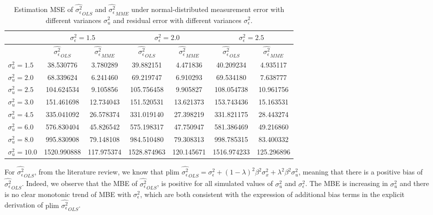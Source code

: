 \documentclass{article}
\begin{document}
\begin{table}[ht]
    \centering
    \caption{Estimation MSE of $\hat{\sigma^2_\epsilon}_{OLS}$ and $\hat{\sigma^2_\epsilon}_{MME}$ under normal-distributed measurement error with different variances $\sigma^2_u$ and residual error with different variances $\sigma^2_\epsilon$.}
    \label{Tab:MSE_sigma_normal}
    \begin{tabular}[t]{lcccccc}
        \hline
        &\multicolumn{2}{c}{$\sigma^2_\epsilon=1.5$}&\multicolumn{2}{c}{$\sigma^2_\epsilon=2.0$}&\multicolumn{2}{c}{$\sigma^2_\epsilon=2.5$}\\
        \hline
        &$\hat{\sigma^2_\epsilon}_{OLS}$&$\hat{\sigma^2_\epsilon}_{MME}$&$\hat{\sigma^2_\epsilon}_{OLS}$&
        $\hat{\sigma^2_\epsilon}_{MME}$&$\hat{\sigma^2_\epsilon}_{OLS}$&$\hat{\sigma^2_\epsilon}_{MME}$\\ 
        \hline
        $\sigma^2_u = 1.5$&38.530776&3.780289&39.882151&4.471836&40.209234&4.935117\\
        $\sigma^2_u = 2.0$&68.339624&6.241460&69.219747&6.910293&69.534180&7.638777\\
        $\sigma^2_u = 2.5$&104.624534&9.105856&105.756458&9.905827&108.054738&10.961756\\
        $\sigma^2_u = 3.0$&151.461698&12.734043&151.520531&13.621373&153.743436&15.163531\\
        $\sigma^2_u = 4.5$&335.041092&26.578374&331.019140&27.398219&331.821175&28.443274\\
        $\sigma^2_u = 6.0$&576.830404&45.826542&575.198317&47.750947&581.386469&49.216860\\
        $\sigma^2_u = 8.0$&995.830908&79.148108&984.510480&79.308313&998.785315&83.400332\\
        $\sigma^2_u = 10.0$&1520.990888&117.975374&1528.874963&120.145671&1516.974233&125.296896\\
        \hline
    \end{tabular}
\end{table}

For $\hat{\sigma^2_\epsilon}_{OLS}$, from the literature review, we know that $\textrm{plim } \hat{\sigma^2_\epsilon}_{OLS} = \sigma_\epsilon^2 + (1-\lambda)^2 \beta^2 \sigma_x^2 + \lambda^2 \beta^2 \sigma_u^2$, meaning that there is a positive bias of $\hat{\sigma^2_\epsilon}_{OLS}$. 
Indeed, we observe that the MBE of $\hat{\sigma^2_\epsilon}_{OLS}$, is positive for all simulated values of $\sigma^2_u$ and $\sigma^2_\epsilon$.
The MBE is increasing in $\sigma^2_u$ and there is no clear monotonic trend of MBE with $\sigma^2_\epsilon$, which are both consistent with the expression of additional bias terms in the explicit derivation of $\textrm{plim } \hat{\sigma^2_\epsilon}_{OLS}$.
\end{document}
